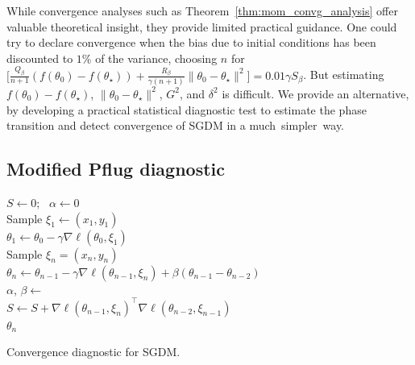 \documentclass[conference]{IEEEtran}
\begin{document}
While convergence analyses such as Theorem~\ref{thm:mom_convg_analysis} offer valuable theoretical insight, they provide limited practical guidance. One could try to declare convergence when the bias due to initial conditions has been discounted to $1\%$ of the variance, 
choosing $n$ for 
$\biggl[ \frac{Q_\beta}{n+1} ( f ( \theta_0 ) - f ( \theta_\star ) ) + \frac{R_\beta}{\gamma ( n+1 )} \| \theta_0 - \theta_\star \|^2 \biggr] = 0.01  \gamma S_\beta$.
But estimating $f ( \theta_0 ) - f ( \theta_\star)$, $ \| \theta_0 - \theta_\star \|^2$, $G^2$, and $\delta^2$ is difficult.
We provide an alternative, by developing a practical statistical diagnostic test to estimate the phase transition and detect convergence of SGDM in a much~simpler~way.

\subsection{Modified Pflug diagnostic}


\begin{algorithm}[h]
\Input{Initial point $\theta_0$,
data $\{ (x_1,y_1)$, $(x_2,y_2)$, $\dots \}$,
$\gamma > 0$, 
$\beta \in [0,1)$,
final momentum $\beta' \in [0, \beta)$, heuristic convergence $h$, 
threshold $T>0$, checking period $c>0$,
$\tt{burnin} > 0$.
}
$S \gets 0$; \ 
$\alpha \gets 0$ \\
Sample $\xi_1 \gets (x_1, y_1)$ \\
$\theta_1 \gets \theta_0 - \gamma \nabla \ell (\theta_0, \xi_1)$ \\
\For {$n \in \{2,3,\dots\}$} {
Sample $\xi_n = (x_n, y_n)$ \\
$\theta_n \gets \theta_{n-1} - \gamma \nabla \ell (\theta_{n-1}, \xi_n) + \beta (\theta_{n-1} - \theta_{n-2})$ \\
$\alpha$, $\beta \gets$  \\
\If {$\alpha > 0$ and $n > \alpha + \tt{burnin}$} {
$S \gets S + \nabla \ell (\theta_{n-1}, \xi_n)^\top \nabla \ell (\theta_{n-2}, \xi_{n-1})$ 
\label{line:test_stat} \\
 {
\KwRet $\theta_n$
}
}
} 
\caption{Convergence diagnostic for SGDM.}
\label{alg:diagnostic}
\end{algorithm}
\end{document}
